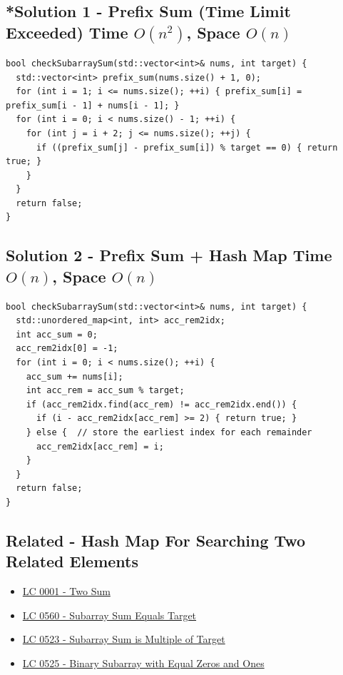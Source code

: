 \subsection*{*Solution 1 - Prefix Sum (Time Limit Exceeded) {\scriptsize\color{gray}\Coffeecup\hspace{1mm}Time $O(n^2)$, Space $O(n)$}}
\begin{lstlisting}
bool checkSubarraySum(std::vector<int>& nums, int target) {
  std::vector<int> prefix_sum(nums.size() + 1, 0);
  for (int i = 1; i <= nums.size(); ++i) { prefix_sum[i] = prefix_sum[i - 1] + nums[i - 1]; }
  for (int i = 0; i < nums.size() - 1; ++i) {
    for (int j = i + 2; j <= nums.size(); ++j) {
      if ((prefix_sum[j] - prefix_sum[i]) % target == 0) { return true; }
    }
  }
  return false;
}
\end{lstlisting}

\subsection*{Solution 2 - Prefix Sum + Hash Map {\scriptsize\color{gray}\Coffeecup\hspace{1mm}Time $O(n)$, Space $O(n)$}}
\begin{lstlisting}
bool checkSubarraySum(std::vector<int>& nums, int target) {
  std::unordered_map<int, int> acc_rem2idx;
  int acc_sum = 0;
  acc_rem2idx[0] = -1;
  for (int i = 0; i < nums.size(); ++i) {
    acc_sum += nums[i];
    int acc_rem = acc_sum % target;
    if (acc_rem2idx.find(acc_rem) != acc_rem2idx.end()) {
      if (i - acc_rem2idx[acc_rem] >= 2) { return true; }
    } else {  // store the earliest index for each remainder
      acc_rem2idx[acc_rem] = i;
    }
  }
  return false;
}
\end{lstlisting}

\subsection*{Related - Hash Map For Searching Two Related Elements}
\begin{itemize}
\item \hyperref[lc0001]{LC 0001 - Two Sum}
\item \hyperref[lc0560]{LC 0560 - Subarray Sum Equals Target}
\item \hyperref[lc0523]{LC 0523 - Subarray Sum is Multiple of Target}
\item \hyperref[lc0525]{LC 0525 - Binary Subarray with Equal Zeros and Ones}
\end{itemize}

